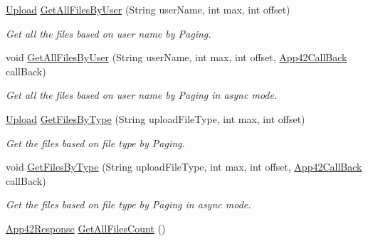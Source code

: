\begin{DoxyCompactItemize}
\hyperlink{classcom_1_1shephertz_1_1app42_1_1paas_1_1sdk_1_1csharp_1_1upload_1_1_upload}{Upload} \hyperlink{classcom_1_1shephertz_1_1app42_1_1paas_1_1sdk_1_1csharp_1_1upload_1_1_upload_service_a18b71fb34953ee7712cf06cc580f3ff8}{Get\+All\+Files\+By\+User} (String user\+Name, int max, int offset)
\begin{DoxyCompactList}\small\item\em Get all the files based on user name by Paging. \end{DoxyCompactList}\item 
void \hyperlink{classcom_1_1shephertz_1_1app42_1_1paas_1_1sdk_1_1csharp_1_1upload_1_1_upload_service_a97e7e9e6049bd6fd355b93ca40f4ddb4}{Get\+All\+Files\+By\+User} (String user\+Name, int max, int offset, \hyperlink{interfacecom_1_1shephertz_1_1app42_1_1paas_1_1sdk_1_1csharp_1_1_app42_call_back}{App42\+Call\+Back} call\+Back)
\begin{DoxyCompactList}\small\item\em Get all the files based on user name by Paging in async mode. \end{DoxyCompactList}\item 
\hyperlink{classcom_1_1shephertz_1_1app42_1_1paas_1_1sdk_1_1csharp_1_1upload_1_1_upload}{Upload} \hyperlink{classcom_1_1shephertz_1_1app42_1_1paas_1_1sdk_1_1csharp_1_1upload_1_1_upload_service_a583f2c10c63667a540b3bf9bae022492}{Get\+Files\+By\+Type} (String upload\+File\+Type, int max, int offset)
\begin{DoxyCompactList}\small\item\em Get the files based on file type by Paging. \end{DoxyCompactList}\item 
void \hyperlink{classcom_1_1shephertz_1_1app42_1_1paas_1_1sdk_1_1csharp_1_1upload_1_1_upload_service_a26aabfed93cd71fb76b3cf4e0bb1cd0a}{Get\+Files\+By\+Type} (String upload\+File\+Type, int max, int offset, \hyperlink{interfacecom_1_1shephertz_1_1app42_1_1paas_1_1sdk_1_1csharp_1_1_app42_call_back}{App42\+Call\+Back} call\+Back)
\begin{DoxyCompactList}\small\item\em Get the files based on file type by Paging in async mode. \end{DoxyCompactList}\item 
\hyperlink{classcom_1_1shephertz_1_1app42_1_1paas_1_1sdk_1_1csharp_1_1_app42_response}{App42\+Response} \hyperlink{classcom_1_1shephertz_1_1app42_1_1paas_1_1sdk_1_1csharp_1_1upload_1_1_upload_service_a72dd76caaaeaa58005771d1999d4df5a}{Get\+All\+Files\+Count} ()

\end{DoxyCompactItemize}
